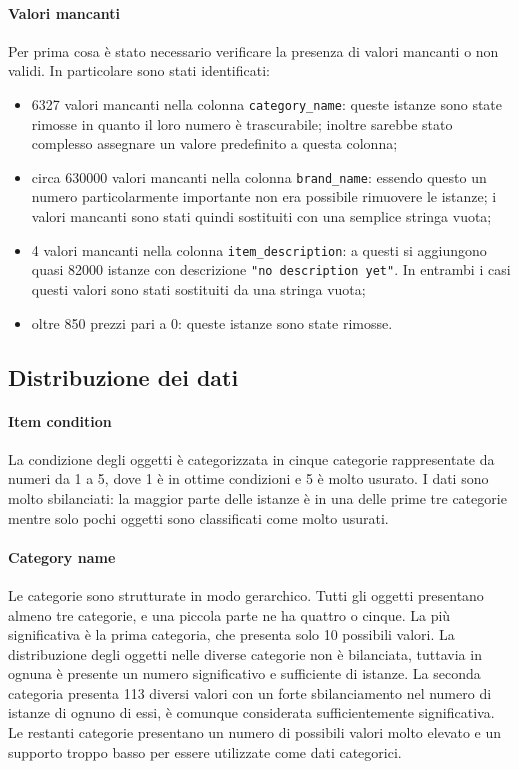 \paragraph{Valori mancanti} Per prima cosa è stato necessario verificare la presenza di valori mancanti o non validi. 
In particolare sono stati identificati:
\begin{itemize}
    \item 6327 valori mancanti nella colonna {\tt category\_name}: queste istanze sono state rimosse in quanto il 
	loro numero è trascurabile; inoltre sarebbe stato complesso assegnare un valore predefinito a questa colonna;
    \item circa 630000 valori mancanti nella colonna {\tt brand\_name}: essendo questo un numero particolarmente 
	importante non era possibile rimuovere le istanze; i valori mancanti sono stati quindi sostituiti con una semplice stringa vuota;
    \item 4 valori mancanti nella colonna {\tt item\_description}: a questi si aggiungono quasi 82000 istanze 
	con descrizione {\tt "no description yet"}. In entrambi i casi questi valori sono stati sostituiti da una stringa vuota;
    \item oltre 850 prezzi pari a 0: queste istanze sono state rimosse.
\end{itemize}

\subsection{Distribuzione dei dati}

\paragraph{Item condition} La condizione degli oggetti è categorizzata in cinque categorie rappresentate da numeri 
da 1 a 5, dove 1 è in ottime condizioni e 5 è molto usurato. I dati sono molto sbilanciati: la maggior 
parte delle istanze è in una delle prime tre categorie mentre solo pochi oggetti sono classificati come molto usurati.

\paragraph{Category name} Le categorie sono strutturate in modo gerarchico. Tutti gli oggetti presentano almeno 
tre categorie, e una piccola parte ne ha quattro o cinque. La più significativa è la prima categoria, che 
presenta solo 10 possibili valori. La distribuzione degli oggetti nelle diverse categorie non è bilanciata, 
tuttavia in ognuna è presente un numero significativo e sufficiente di istanze. La seconda categoria presenta 
113 diversi valori con un forte sbilanciamento nel numero di istanze di ognuno di essi, è comunque considerata 
sufficientemente significativa. Le restanti categorie presentano un numero di possibili valori molto elevato 
e un supporto troppo basso per essere utilizzate come dati categorici.

